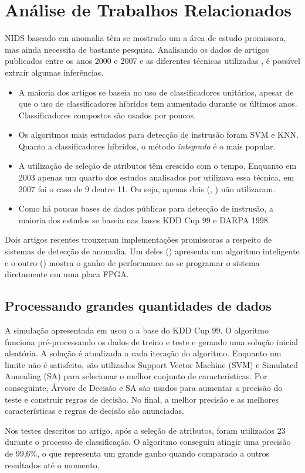 \chapter{Análise de Trabalhos Relacionados}
\label{analise}

NIDS baseado em anomalia têm se mostrado um a área de estudo promissora, mas ainda necessita de bastante pesquisa.
Analisando os dados de artigos publicados entre os anos 2000 e 2007 e as diferentes técnicas utilizadas \cite{tsai09},
é possível extrair algumas inferências.
\begin{itemize}
    \item  A maioria dos artigos se baseia no uso de classificadores unitários, apesar de que o uso de
    classificadores híbridos tem aumentado durante os últimos anos. Classificadores compostos são usados por poucos.

    \item Os algoritmos mais estudados para detecção de instrusão foram SVM e KNN. Quanto a classificadores híbridos,
    o método \textit{integrado} é o mais popular.

    \item A utilização de seleção de atributos têm crescido com o tempo. Enquanto em 2003 apenas um quarto dos estudos analisados
por \cite{tsai09} utilizava essa técnica, em 2007 foi o caso de 9 dentre 11. Ou seja, apenas dois
(\cite{peddabachigari07}, \cite{li07}) não utilizaram.

    \item Como há poucas bases de dados públicas para detecção de instrusão, a maioria dos estudos se baseia nas
    bases KDD Cup 99 e DARPA 1998.
\end{itemize}

\par Dois artigos recentes trouxeram implementações promissoras a respeito de sistemas de detecção de
anomalia. Um deles (\cite{lin12}) apresenta um algoritmo inteligente e o outro (\cite{papadonikolakis12}) mostra o
ganho de performance ao se programar o sistema diretamente em uma placa FPGA.

\section{Processando grandes quantidades de dados}
A simulação apresentada em \cite{lin12} usou o a base do KDD Cup 99. O algoritmo funciona pré-processando os dados de treino e teste e gerando uma solução
inicial aleatória. A solução é atualizada a cada iteração do algoritmo. Enquanto um limite não é satisfeito,
são utilizados Support Vector Machine (SVM) e Simulated Annealing (SA) para selecionar o melhor conjunto de
características. Por conseguinte, Árvore de Decisão e SA são usados para aumentar a precisão do teste e construir
regras de decisão. No final, a melhor precisão e as melhores características e regras de decisão são anunciadas.
\par Nos testes descritos no  artigo, após a seleção de atributos, foram utilizados 23 durante o processo de
classificação. O algoritmo conseguiu atingir uma precisão de 99,6\%, o que representa um grande ganho quando comparado
 a outros resultados até o momento.

